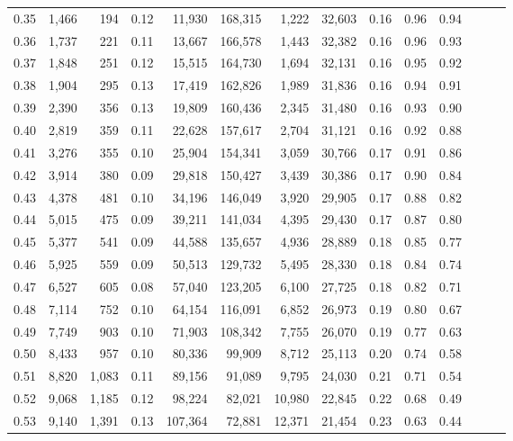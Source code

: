 \begin{tabular}{rrrrrrrrrrrrrr}
0.35 &  1,466 &    194 &  0.12 &   11,930 &  168,315 &   1,222 &  32,603 &  0.16 &  0.96 &      0.94 \\
0.36 &  1,737 &    221 &  0.11 &   13,667 &  166,578 &   1,443 &  32,382 &  0.16 &  0.96 &      0.93 \\
0.37 &  1,848 &    251 &  0.12 &   15,515 &  164,730 &   1,694 &  32,131 &  0.16 &  0.95 &      0.92 \\
0.38 &  1,904 &    295 &  0.13 &   17,419 &  162,826 &   1,989 &  31,836 &  0.16 &  0.94 &      0.91 \\
0.39 &  2,390 &    356 &  0.13 &   19,809 &  160,436 &   2,345 &  31,480 &  0.16 &  0.93 &      0.90 \\
0.40 &  2,819 &    359 &  0.11 &   22,628 &  157,617 &   2,704 &  31,121 &  0.16 &  0.92 &      0.88 \\
0.41 &  3,276 &    355 &  0.10 &   25,904 &  154,341 &   3,059 &  30,766 &  0.17 &  0.91 &      0.86 \\
0.42 &  3,914 &    380 &  0.09 &   29,818 &  150,427 &   3,439 &  30,386 &  0.17 &  0.90 &      0.84 \\
0.43 &  4,378 &    481 &  0.10 &   34,196 &  146,049 &   3,920 &  29,905 &  0.17 &  0.88 &      0.82 \\
0.44 &  5,015 &    475 &  0.09 &   39,211 &  141,034 &   4,395 &  29,430 &  0.17 &  0.87 &      0.80 \\
0.45 &  5,377 &    541 &  0.09 &   44,588 &  135,657 &   4,936 &  28,889 &  0.18 &  0.85 &      0.77 \\
0.46 &  5,925 &    559 &  0.09 &   50,513 &  129,732 &   5,495 &  28,330 &  0.18 &  0.84 &      0.74 \\
0.47 &  6,527 &    605 &  0.08 &   57,040 &  123,205 &   6,100 &  27,725 &  0.18 &  0.82 &      0.71 \\
0.48 &  7,114 &    752 &  0.10 &   64,154 &  116,091 &   6,852 &  26,973 &  0.19 &  0.80 &      0.67 \\
0.49 &  7,749 &    903 &  0.10 &   71,903 &  108,342 &   7,755 &  26,070 &  0.19 &  0.77 &      0.63 \\
0.50 &  8,433 &    957 &  0.10 &   80,336 &   99,909 &   8,712 &  25,113 &  0.20 &  0.74 &      0.58 \\
0.51 &  8,820 &  1,083 &  0.11 &   89,156 &   91,089 &   9,795 &  24,030 &  0.21 &  0.71 &      0.54 \\
0.52 &  9,068 &  1,185 &  0.12 &   98,224 &   82,021 &  10,980 &  22,845 &  0.22 &  0.68 &      0.49 \\
0.53 &  9,140 &  1,391 &  0.13 &  107,364 &   72,881 &  12,371 &  21,454 &  0.23 &  0.63 &      0.44 \\

\end{tabular}
